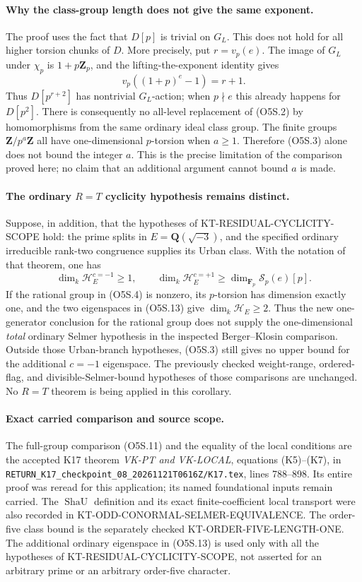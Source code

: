 \paragraph{Why the class-group length does not give the same exponent.}
The proof uses the fact that $D[p]$ is trivial on $G_L$.
This does not hold for all higher torsion chunks of $D$.
More precisely, put $r=v_p(e)$.  The image of $G_L$ under
$\chi_p$ is $1+p\mathbf Z_p$, and the lifting-the-exponent
identity gives
\[
                  v_p((1+p)^e-1)=r+1.
 \tag{O5S.12}
\]
Thus $D[p^{r+2}]$ has nontrivial $G_L$-action; when $p\nmid e$
this already happens for $D[p^2]$.
There is consequently no all-level replacement of (O5S.2)
by homomorphisms from the same ordinary ideal class group.
The finite groups $\mathbf Z/p^a\mathbf Z$ all have
one-dimensional $p$-torsion when $a\ge1$.
Therefore (O5S.3) alone does not bound the integer $a$.
This is the precise limitation of the comparison proved here;
no claim that an additional argument cannot bound $a$ is made.

\paragraph{The ordinary $R=T$ cyclicity hypothesis remains distinct.}
Suppose, in addition, that the hypotheses of
KT-RESIDUAL-CYCLICITY-SCOPE hold: the prime splits in
$E=\mathbf Q(\sqrt{-3})$, and the specified ordinary
irreducible rank-two congruence supplies its Urban class.
With the notation of that theorem, one has
\[
 \dim_k\mathcal H_E^{c=-1}\ge1,
 \qquad
 \dim_k\mathcal H_E^{c=+1}
        \ge\dim_{\mathbf F_p}\mathcal S_p(e)[p].
 \tag{O5S.13}
\]
If the rational group in (O5S.4) is nonzero, its $p$-torsion
has dimension exactly one, and the two eigenspaces in
(O5S.13) give $\dim_k\mathcal H_E\ge2$.
Thus the new one-generator conclusion for the rational
group does not supply the one-dimensional \emph{total}
ordinary Selmer hypothesis in the inspected Berger--Klosin
comparison.  Outside those Urban-branch hypotheses,
(O5S.3) still gives no upper bound for the additional
$c=-1$ eigenspace.  The previously checked weight-range,
ordered-flag, and divisible-Selmer-bound hypotheses of
those comparisons are unchanged.  No $R=T$ theorem is
being applied in this corollary.

\paragraph{Exact carried comparison and source scope.}
The full-group comparison (O5S.11) and the equality of
the local conditions are the accepted K17 theorem
\emph{VK-PT and VK-LOCAL}, equations (K5)--(K7), in
\texttt{RETURN\_K17\_checkpoint\_08\_20261121T0616Z/K17.tex},
lines 788--898.  Its entire proof was reread for this
application; its named foundational inputs remain carried.
The $\operatorname{ShaU}$ definition and its exact
finite-coefficient local transport were also recorded in
KT-ODD-CONORMAL-SELMER-EQUIVALENCE.
The order-five class bound is the separately checked
KT-ORDER-FIVE-LENGTH-ONE.  The additional ordinary
eigenspace in (O5S.13) is used only with all the hypotheses
of KT-RESIDUAL-CYCLICITY-SCOPE, not asserted for an arbitrary
prime or an arbitrary order-five character.
